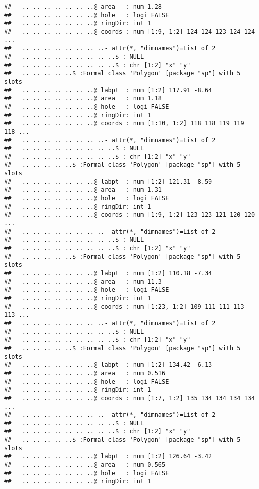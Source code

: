 \documentclass[]{article}
\begin{document}
\begin{verbatim}
##   .. .. .. .. .. .. ..@ area   : num 1.28
##   .. .. .. .. .. .. ..@ hole   : logi FALSE
##   .. .. .. .. .. .. ..@ ringDir: int 1
##   .. .. .. .. .. .. ..@ coords : num [1:9, 1:2] 124 124 123 124 124 ...
##   .. .. .. .. .. .. .. ..- attr(*, "dimnames")=List of 2
##   .. .. .. .. .. .. .. .. ..$ : NULL
##   .. .. .. .. .. .. .. .. ..$ : chr [1:2] "x" "y"
##   .. .. .. .. ..$ :Formal class 'Polygon' [package "sp"] with 5 slots
##   .. .. .. .. .. .. ..@ labpt  : num [1:2] 117.91 -8.64
##   .. .. .. .. .. .. ..@ area   : num 1.18
##   .. .. .. .. .. .. ..@ hole   : logi FALSE
##   .. .. .. .. .. .. ..@ ringDir: int 1
##   .. .. .. .. .. .. ..@ coords : num [1:10, 1:2] 118 118 119 119 118 ...
##   .. .. .. .. .. .. .. ..- attr(*, "dimnames")=List of 2
##   .. .. .. .. .. .. .. .. ..$ : NULL
##   .. .. .. .. .. .. .. .. ..$ : chr [1:2] "x" "y"
##   .. .. .. .. ..$ :Formal class 'Polygon' [package "sp"] with 5 slots
##   .. .. .. .. .. .. ..@ labpt  : num [1:2] 121.31 -8.59
##   .. .. .. .. .. .. ..@ area   : num 1.31
##   .. .. .. .. .. .. ..@ hole   : logi FALSE
##   .. .. .. .. .. .. ..@ ringDir: int 1
##   .. .. .. .. .. .. ..@ coords : num [1:9, 1:2] 123 123 121 120 120 ...
##   .. .. .. .. .. .. .. ..- attr(*, "dimnames")=List of 2
##   .. .. .. .. .. .. .. .. ..$ : NULL
##   .. .. .. .. .. .. .. .. ..$ : chr [1:2] "x" "y"
##   .. .. .. .. ..$ :Formal class 'Polygon' [package "sp"] with 5 slots
##   .. .. .. .. .. .. ..@ labpt  : num [1:2] 110.18 -7.34
##   .. .. .. .. .. .. ..@ area   : num 11.3
##   .. .. .. .. .. .. ..@ hole   : logi FALSE
##   .. .. .. .. .. .. ..@ ringDir: int 1
##   .. .. .. .. .. .. ..@ coords : num [1:23, 1:2] 109 111 111 113 113 ...
##   .. .. .. .. .. .. .. ..- attr(*, "dimnames")=List of 2
##   .. .. .. .. .. .. .. .. ..$ : NULL
##   .. .. .. .. .. .. .. .. ..$ : chr [1:2] "x" "y"
##   .. .. .. .. ..$ :Formal class 'Polygon' [package "sp"] with 5 slots
##   .. .. .. .. .. .. ..@ labpt  : num [1:2] 134.42 -6.13
##   .. .. .. .. .. .. ..@ area   : num 0.516
##   .. .. .. .. .. .. ..@ hole   : logi FALSE
##   .. .. .. .. .. .. ..@ ringDir: int 1
##   .. .. .. .. .. .. ..@ coords : num [1:7, 1:2] 135 134 134 134 134 ...
##   .. .. .. .. .. .. .. ..- attr(*, "dimnames")=List of 2
##   .. .. .. .. .. .. .. .. ..$ : NULL
##   .. .. .. .. .. .. .. .. ..$ : chr [1:2] "x" "y"
##   .. .. .. .. ..$ :Formal class 'Polygon' [package "sp"] with 5 slots
##   .. .. .. .. .. .. ..@ labpt  : num [1:2] 126.64 -3.42
##   .. .. .. .. .. .. ..@ area   : num 0.565
##   .. .. .. .. .. .. ..@ hole   : logi FALSE
##   .. .. .. .. .. .. ..@ ringDir: int 1

\end{verbatim}
\end{document}
